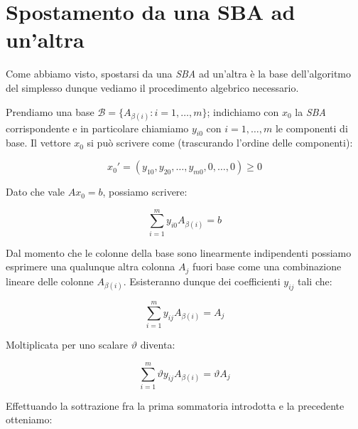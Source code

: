 \documentclass[11pt]{book}
\begin{document}
\section{Spostamento da una SBA ad un'altra}

Come abbiamo visto, spostarsi da una {\em SBA} ad un'altra \`e la base
dell'algoritmo del simplesso dunque vediamo il procedimento algebrico
necessario.

Prendiamo una base $\mathcal{B} = \{ A_{\beta(i)} : i = 1, \dots, m
\}$; indichiamo con $x_0$ la {\em SBA} corrispondente e in particolare
chiamiamo $y_{i0}$ con $i = 1, \dots, m$ le componenti di base. Il
vettore $x_0$ si pu\`o scrivere come (trascurando l'ordine delle
componenti):

\begin{center}
\begin{equation}
x_0' = (y_{10}, y_{20}, \dots, y_{m0}, 0, \dots, 0) \geq 0
\end{equation}
\end{center}

Dato che vale $Ax_0 = b$, possiamo scrivere:

\begin{center}
\begin{equation}
\sum\limits_{i=1}^m y_{i0} A_{\beta(i)} = b
\label{prima}
\end{equation}
\end{center}

Dal momento che le colonne della base sono linearmente indipendenti
possiamo esprimere una qualunque altra colonna $A_j$ fuori base come una
combinazione lineare delle colonne $A_{\beta(i)}$. Esisteranno dunque
dei coefficienti $y_{ij}$ tali che:

\begin{center}
\begin{equation}
\sum\limits_{i=1}^m y_{ij} A_{\beta(i)} = A_j
\label{seconda}
\end{equation}
\end{center}

Moltiplicata per uno scalare $\vartheta$ diventa:

\begin{center}
\begin{equation}
\sum\limits_{i=1}^m \vartheta y_{ij} A_{\beta(i)} = \vartheta A_j
\label{terza}
\end{equation}
\end{center}

Effettuando la sottrazione fra la prima sommatoria introdotta e la
precedente otteniamo:
\end{document}
